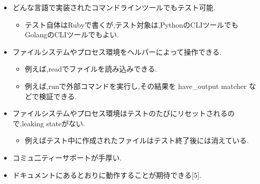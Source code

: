 \begin{itemize}
\item どんな言語で実装されたコマンドラインツールでもテスト可能.
\begin{itemize}
\item テスト自体はRubyで書くが,テスト対象は,PythonのCLIツールでもGolangのCLIツールでもよい.
\end{itemize}
\item ファイルシステムやプロセス環境をヘルパーによって操作できる.
\begin{itemize}
\item 例えば,readでファイルを読み込みできる.
\item 例えば,runで外部コマンドを実行し,その結果を have\_output matcher などで検証できる.
\end{itemize}
\item ファイルシステムやプロセス環境はテストのたびにリセットされるので,leaking stateがない.
\begin{itemize}
\item 例えばテスト中に作成されたファイルはテスト終了後には消えている.
\end{itemize}
\item コミュ二ティーサポートが手厚い.
\item ドキュメントにあるとおりに動作することが期待できる[5].
\end{itemize}
